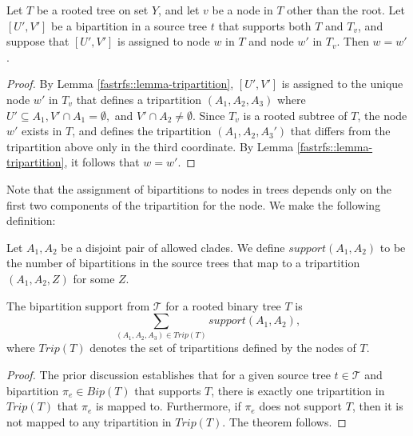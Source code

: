 \begin{lemma}
Let $T$ be a rooted tree on set $Y$, and let $v$ be a node
in $T$ other than the root.  
Let $[U',V']$ be a bipartition in 
a source tree $t$ that supports both $T$ and $T_v$,
and suppose that $[U',V']$ is assigned to node $w$ in $T$
and node $w'$ in $T_v$. Then $w=w'$.
\label{fastrfs::lemma-unique}
\end{lemma}
\begin{proof}
By Lemma \ref{fastrfs::lemma-tripartition},
$[U',V']$ is assigned
to the unique node $w'$ in $T_v$ that defines a  tripartition
$(A_1, A_2, A_3)$ where
$U' \subseteq A_1, V' \cap A_1 = \emptyset, $ and
$V' \cap A_2 \neq \emptyset$.
Since $T_v$ is a rooted subtree of $T$, the node $w'$ exists
in $T$, and defines the tripartition $(A_1, A_2, A_3')$ that
differs from the tripartition above
only in the third coordinate.
By Lemma \ref{fastrfs::lemma-tripartition}, it
follows that $w=w'$.
\end{proof}
Note that the assignment of bipartitions to nodes in
trees depends only on the first two
components of the tripartition for the node. We
make the following definition:
\begin{definition}
Let $A_1, A_2$ be a disjoint pair of
allowed clades.
We define $support(A_1,A_2)$ to be
the  number of bipartitions in the
source trees that map to a
tripartition $(A_1,A_2,Z)$ for
some $Z$.
\end{definition}
\begin{theorem}
The bipartition
support from $\mathcal{T}$ for a rooted binary tree $T$ is
 \begin{equation}\sum_{(A_1,A_2,A_3) \in Trip(T)} support(A_1,A_2),\end{equation}
where
$Trip(T)$ denotes the set of tripartitions
defined by the nodes of  $T$.
\label{fastrfs::eqn:thm1}
\end{theorem}
\begin{proof}
The prior discussion establishes that for a given
source tree $t \in \mathcal{T}$ and bipartition $\pi_e \in Bip(T)$
that supports $T$, 
there is exactly one tripartition in $Trip(T)$ that
$\pi_e$ is mapped to. Furthermore, if $\pi_e$ does not
support $T$, then it is not mapped to any tripartition in $Trip(T)$.
The theorem follows.
\end{proof}






